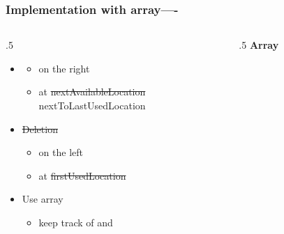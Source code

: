 \documentclass{beamer}
\begin{document}
\begin{frame}\frametitle{Implementation with array----}
	\begin{columns}[T] %
	\begin{column}{.5\linewidth} %
		\begin{itemize}
			\item
			
				\begin{itemize}
					\item
					on the right
					\item 
					at  
					\sout{nextAvailableLocation}\\
					nextToLastUsedLocation
				\end{itemize}			

			\item
			\sout{Deletion}
				\begin{itemize}
					\item
					on the left
					\item 
					at  
					\sout{firstUsedLocation}
				\end{itemize}			
			\item
			Use array
				\begin{itemize}
					\item 
					keep track of  
					 and
				\end{itemize}			
		\end{itemize}
	\end{column} %
	\begin{column}{.5\linewidth} %
	    	\textbf{Array}

		\\
		
		\\
		
		\\
		

\end{column}
\end{columns}
\end{frame}
\end{document}
